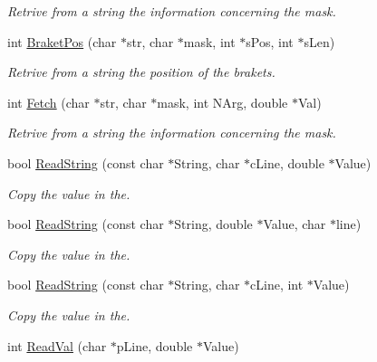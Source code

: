 \begin{DoxyCompactItemize}
\begin{DoxyCompactList}\small\item\em Retrive from a string the information concerning the mask. \end{DoxyCompactList}\item 
int \hyperlink{classVarData_a57563378ffd76c20068f612fbec29e3d}{Braket\+Pos} (char $\ast$str, char $\ast$mask, int $\ast$s\+Pos, int $\ast$s\+Len)\hypertarget{classVarData_a57563378ffd76c20068f612fbec29e3d}{}\label{classVarData_a57563378ffd76c20068f612fbec29e3d}

\begin{DoxyCompactList}\small\item\em Retrive from a string the position of the brakets. \end{DoxyCompactList}\item 
int \hyperlink{classVarData_a05ab100c879ea5377012188f65db69b1}{Fetch} (char $\ast$str, char $\ast$mask, int N\+Arg, double $\ast$Val)\hypertarget{classVarData_a05ab100c879ea5377012188f65db69b1}{}\label{classVarData_a05ab100c879ea5377012188f65db69b1}

\begin{DoxyCompactList}\small\item\em Retrive from a string the information concerning the mask. \end{DoxyCompactList}\item 
bool \hyperlink{classVarData_ab48c8e53b923767c73cb13848ecd2fd6}{Read\+String} (const char $\ast$String, char $\ast$c\+Line, double $\ast$Value)
\begin{DoxyCompactList}\small\item\em Copy the value in the. \end{DoxyCompactList}\item 
bool \hyperlink{classVarData_a337c48b3218d18409ff180f710421f2d}{Read\+String} (const char $\ast$String, double $\ast$Value, char $\ast$line)
\begin{DoxyCompactList}\small\item\em Copy the value in the. \end{DoxyCompactList}\item 
bool \hyperlink{classVarData_adaef8865e533156a71becc0fa083eb9b}{Read\+String} (const char $\ast$String, char $\ast$c\+Line, int $\ast$Value)
\begin{DoxyCompactList}\small\item\em Copy the value in the. \end{DoxyCompactList}\item 
int \hyperlink{classVarData_a91210b2064dbd96a76aeeadf9a3d3364}{Read\+Val} (char $\ast$p\+Line, double $\ast$Value)\hypertarget{classVarData_a91210b2064dbd96a76aeeadf9a3d3364}{}\label{classVarData_a91210b2064dbd96a76aeeadf9a3d3364}


\end{DoxyCompactItemize}

